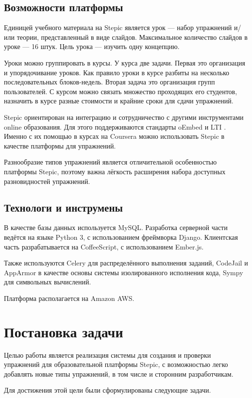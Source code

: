 \documentclass{matmex-diploma-custom}
\begin{document}
\subsection{Возможности платформы}
Единицей учебного материала на Stepic является урок --- набор упражнений
и/или теории, представленный в виде слайдов. Максимальное количество
слайдов в уроке --- 16 штук. Цель урока --- изучить одну концепцию.

Уроки можно группировать в курсы. У курса две задачи. Первая это
организация и упорядочивание уроков. Как правило уроки в курсе разбиты
на несколько последовательных блоков-недель. Вторая задача это
организация групп пользователей. С курсом можно связать множество
проходящих его студентов, назначить в курсе разные стоимости и крайние
сроки для сдачи упражнений.

Stepic ориентирован на интеграцию и сотрудничество с другими
инструментами online образования. Для этого поддерживаются стандарты
oEmbed и LTI  \cite{dagger2007service}. Именно с их помощью в курсах на
Coursera можно использовать Stepic в качестве платформы для
упражнений.

Разнообразие типов упражнений является отличительной особенностью
платформы Stepic, поэтому важна лёгкость расширения набора доступных
разновидностей упражнений.

\subsection{Технологи и инструмены}
В качестве базы данных используется MySQL. Разработка серверной части
ведётся на языке Python 3, с использованием фреймворка
Django. Клиентская часть разрабатывается на CoffeeScript, с
использованием Ember.js.

Также используются Celery для распределённого выполнения заданий,
CodeJail и AppArmor в качестве основы системы изолированного
исполнения кода, Sympy для символьных вычислений.

Платформа располагается на Amazon AWS.

\section{Постановка задачи}
Целью работы является реализация системы для создания и проверки
упражнений для образовательной платформы Stepic, с возможностью легко
добавлять новые типы упражнений, в том числе и сторонним
разработчикам.

Для достижения этой цели были сформулированы следующие задачи.
\end{document}
